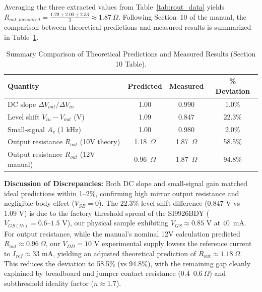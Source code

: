 \documentclass[11pt, a4paper]{article}
\begin{document}
Averaging the three extracted values from Table~\ref{tab:rout_data} yields $R_{out,measured} = \frac{1.29 + 2.00 + 2.33}{3} \approx 1.87\ \Omega$. Following Section~10 of the manual, the comparison between theoretical predictions and measured results is summarized in Table~\ref{tab:comparison}.

\begin{table}[H]
    \centering
    \small
    \vspace{-1ex}
    \begin{tabular}{lccc}
        \toprule
        \textbf{Quantity} & \textbf{Predicted} & \textbf{Measured} & \textbf{\% Deviation} \\
        \midrule
        DC slope $\Delta V_{out} / \Delta V_{in}$ & 1.00 & 0.990 & 1.0\% \\
        Level shift $V_{in} - V_{out}$ (V)    & 1.09 & 0.847 & 22.3\% \\
        Small-signal $A_v$ (1 kHz)               & 1.00 & 0.980 & 2.0\% \\
        Output resistance $R_{out}$ (10V theory) & 1.18~$\Omega$ & 1.87~$\Omega$ & 58.5\% \\
        Output resistance $R_{out}$ (12V manual) & 0.96~$\Omega$ & 1.87~$\Omega$ & 94.8\% \\
        \bottomrule
    \end{tabular}
    \vspace{-1ex}
    \caption{Summary Comparison of Theoretical Predictions and Measured Results (Section 10 Table).}
    \label{tab:comparison}
\end{table}
\vspace{-1ex}

\noindent\textbf{Discussion of Discrepancies:} Both DC slope and small-signal gain matched ideal predictions within 1--2\%, confirming high mirror output resistance and negligible body effect ($V_{SB}=0$). The 22.3\% level shift difference ($0.847\text{ V}$ vs $1.09\text{ V}$) is due to the factory threshold spread of the SI9926BDY ($V_{GS(th)} = 0.6\text{--}1.5\text{ V}$), our physical sample exhibiting $V_{GS} \approx 0.85\text{ V}$ at 40~mA. For output resistance, while the manual's nominal 12V calculation predicted $R_{out} \approx 0.96\ \Omega$, our $V_{DD} = 10\text{ V}$ experimental supply lowers the reference current to $I_{ref} \approx 33\text{ mA}$, yielding an adjusted theoretical prediction of $R_{out} \approx 1.18\ \Omega$. This reduces the deviation to 58.5\% (vs 94.8\%), with the remaining gap cleanly explained by breadboard and jumper contact resistance ($0.4\text{--}0.6\ \Omega$) and subthreshold ideality factor ($n \approx 1.7$).
\end{document}
